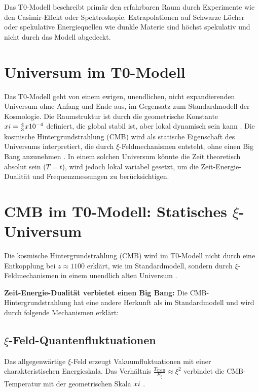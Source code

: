 \documentclass[12pt,a4paper]{report}
\begin{document}
\begin{warning}[Hinweis]
	Das T0-Modell beschreibt primär den erfahrbaren Raum durch Experimente wie den Casimir-Effekt oder Spektroskopie. Extrapolationen auf Schwarze Löcher oder spekulative Energiequellen wie dunkle Materie sind höchst spekulativ und nicht durch das Modell abgedeckt.
\end{warning}

\section{Universum im T0-Modell}
\label{sec:universum}

Das T0-Modell geht von einem ewigen, unendlichen, nicht expandierenden Universum ohne Anfang und Ende aus, im Gegensatz zum Standardmodell der Kosmologie. Die Raumstruktur ist durch die geometrische Konstante \(xi = \frac{4}{3} x 10^{-4}\) definiert, die global stabil ist, aber lokal dynamisch sein kann \cite{pascher_t0_energie_2025}. Die kosmische Hintergrundstrahlung (CMB) wird als statische Eigenschaft des Universums interpretiert, die durch \(\xi\)-Feldmechanismen entsteht, ohne einen Big Bang anzunehmen \cite{pascher_t0_cmb_2025}. In einem solchen Universum könnte die Zeit theoretisch absolut sein (\( T = t \)), wird jedoch lokal variabel gesetzt, um die Zeit-Energie-Dualität und Frequenzmessungen zu berücksichtigen.

\section{CMB im T0-Modell: Statisches \(\xi\)-Universum}
\label{sec:cmb}

Die kosmische Hintergrundstrahlung (CMB) wird im T0-Modell nicht durch eine Entkopplung bei \( z \approx 1100 \) erklärt, wie im Standardmodell, sondern durch \(\xi\)-Feldmechanismen in einem unendlich alten Universum \cite{pascher_t0_cmb_2025}.

\textbf{Zeit-Energie-Dualität verbietet einen Big Bang:} Die CMB-Hintergrundstrahlung hat eine andere Herkunft als im Standardmodell und wird durch folgende Mechanismen erklärt:

\subsection{\(\xi\)-Feld-Quantenfluktuationen}
\label{subsec:xi-fluktuationen}

Das allgegenwärtige \(\xi\)-Feld erzeugt Vakuumfluktuationen mit einer charakteristischen Energieskala. Das Verhältnis \( \frac{T_{\text{CMB}}}{E_\xi} \approx \xi^2 \) verbindet die CMB-Temperatur mit der geometrischen Skala \(xi\) \cite{pascher_t0_cmb_2025}.
\end{document}
